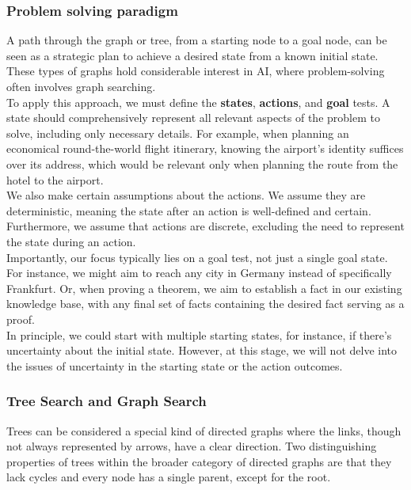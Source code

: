 \documentclass[a4paper,UKenglish,cleveref, autoref, thm-restate]{qlinhta}
\begin{document}
    \subsubsection{Problem solving paradigm}

    A path through the graph or tree, from a starting node to a goal node, can be seen as a strategic plan to achieve a desired state from a known initial state. These types of graphs hold considerable interest in AI, where problem-solving often involves graph searching.\\

    To apply this approach, we must define the \textbf{states}, \textbf{actions}, and \textbf{goal} tests. A state should comprehensively represent all relevant aspects of the problem to solve, including only necessary details. For example, when planning an economical round-the-world flight itinerary, knowing the airport's identity suffices over its address, which would be relevant only when planning the route from the hotel to the airport.\\

    We also make certain assumptions about the actions. We assume they are deterministic, meaning the state after an action is well-defined and certain. Furthermore, we assume that actions are discrete, excluding the need to represent the state during an action.\\

    Importantly, our focus typically lies on a goal test, not just a single goal state. For instance, we might aim to reach any city in Germany instead of specifically Frankfurt. Or, when proving a theorem, we aim to establish a fact in our existing knowledge base, with any final set of facts containing the desired fact serving as a proof. \\

    In principle, we could start with multiple starting states, for instance, if there's uncertainty about the initial state. However, at this stage, we will not delve into the issues of uncertainty in the starting state or the action outcomes.\\

    \subsubsection{Tree Search and Graph Search}

    Trees can be considered a special kind of directed graphs where the links, though not always represented by arrows, have a clear direction. Two distinguishing properties of trees within the broader category of directed graphs are that they lack cycles and every node has a single parent, except for the root.\\
\end{document}
